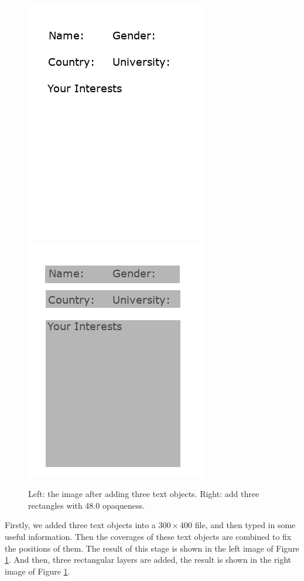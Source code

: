 \documentclass{article}
\begin{document}
\begin{figure}[h]
    \centering
    \includegraphics{img/sectionPNG/table2.png}
    \includegraphics{img/sectionPNG/table1.png}
    \caption{Left: the image after adding three text objects. 
    Right: add three rectangles with 48.0 opaqueness.}
    \label{fig: figure2}
\end{figure}

\noindent
Firstly, we added three text objects into a $ 300 \times 400 $ file, and then 
typed in some useful information. Then the coverages of these text objects are
combined to fix the positions of them. The result of this stage is shown in the 
left image of Figure \ref{fig: figure2}. And then, three rectangular layers are 
added, the result is shown in the right image of Figure \ref{fig: figure2}. 
\end{document}
